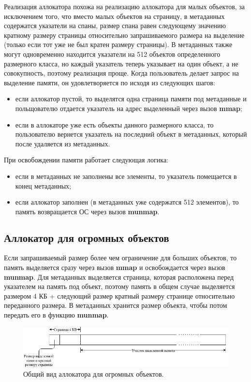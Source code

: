 Реализация аллокатора похожа на реализацию аллокатора для малых объектов, за исключением того, что вместо малых объектов на страницу, в метаданных содержатся указатели на спаны, размер спана равен следующему значению кратному размеру страницы относительно запрашиваемого размера на выделение (только если тот уже не был кратен размеру страницы). В метаданных также могут одновременно находится указатели на 512 объектов определенного размерного класса, но каждый указатель теперь указывает на один объект, а не совокупность, поэтому реализация проще. Когда пользователь делает запрос на выделение памяти, он удовлетворяется по исходя из следующих шагов:
\begin{itemize}
	\item если аллокатор пустой, то выделятся одна страница памяти под метаданные и польщователю отдается указатель на адрес выделенный через вызов \textbf{mmap};
	\item если в аллокаторе уже есть объекты данного размерного класса, то пользователю вернется указатель на последний объект в метаданных, который после удаляется из метаданных.
\end{itemize}

При освобождении памяти работает следующая логика:
\begin{itemize}
	\item если в метаданных не заполнены все элементы, то указатель помещается в конец метаданных;
	\item если аллокатор заполнен (в метаданных уже содержатся 512 элементов), то память возвращается ОС через вызов \textbf{munmap}.
\end{itemize}

\subsection{Аллокатор для огромных объектов}
Если запрашиваемый размер более чем ограничение для больших объектов, то память выделяется сразу через вызов \textbf{mmap} и освобождается через вызов \textbf{munmap}. Для метаданных выделяется страница, которая расположена перед указателем на память под объект, поэтому память в общем случае выделяется размером 4 КБ + следующий размер кратный размеру странице относительно переданного размера. В метаданных хранится размер объекта, чтобы потом передать его в функцию \textbf{munmap}.

\begin{figure}[!h]
	\begin{center}
		\includegraphics[scale=0.5]{images/huge-allocator-design.png}
		\caption{Общий вид аллокатора для огромных объектов.}
		\label{huge-allocator-design}
	\end{center}
\end{figure}

